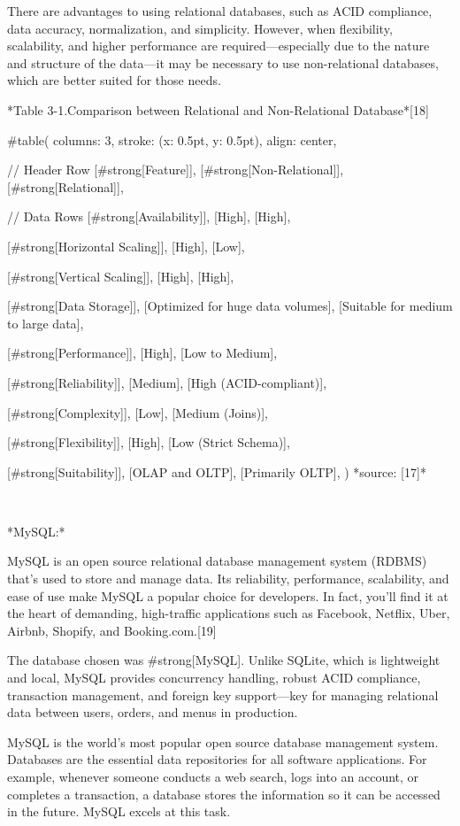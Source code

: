 There are advantages to using relational databases, such as ACID compliance, data accuracy, normalization, and simplicity. However, when flexibility, scalability, and higher performance are required—especially due to the nature and structure of the data—it may be necessary to use non-relational databases, which are better suited for those needs.
\
\
\

*Table 3-1.Comparison between Relational and Non-Relational Database*[18]

#table(
  columns: 3,
  stroke: (x: 0.5pt, y: 0.5pt),
  align: center,

  // Header Row
  [#strong[Feature]],
  [#strong[Non-Relational]],
  [#strong[Relational]],

  // Data Rows
  [#strong[Availability]],
  [High],
  [High],

  [#strong[Horizontal Scaling]],
  [High],
  [Low],

  [#strong[Vertical Scaling]],
  [High],
  [High],

  [#strong[Data Storage]],
  [Optimized for huge data volumes],
  [Suitable for medium to large data],

  [#strong[Performance]],
  [High],
  [Low to Medium],

  [#strong[Reliability]],
  [Medium],
  [High (ACID-compliant)],

  [#strong[Complexity]],
  [Low],
  [Medium (Joins)],

  [#strong[Flexibility]],
  [High],
  [Low (Strict Schema)],

  [#strong[Suitability]],
  [OLAP and OLTP],
  [Primarily OLTP],
)
*source: [17]*\

\

*MySQL:*

MySQL is an open source relational database management system (RDBMS) that’s used to store and manage data. Its reliability, performance, scalability, and ease of use make MySQL a popular choice for developers. In fact, you’ll find it at the heart of demanding, high-traffic applications such as Facebook, Netflix, Uber, Airbnb, Shopify, and Booking.com.[19]

The database chosen was #strong[MySQL]. Unlike SQLite, which is lightweight and local, MySQL provides concurrency handling, robust ACID compliance, transaction management, and foreign key support—key for managing relational data between users, orders, and menus in production.

MySQL is the world’s most popular open source database management system. Databases are the essential data repositories for all software applications. For example, whenever someone conducts a web search, logs into an account, or completes a transaction, a database stores the information so it can be accessed in the future. MySQL excels at this task.

